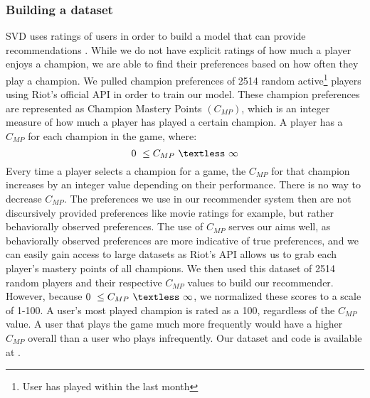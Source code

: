 \documentclass [11pt]{IEEEtran}
\begin{document}
\subsubsection{Building a dataset}
SVD uses ratings of users in order to build a model that can provide recommendations \cite{koren2009matrix}. While we do not have explicit ratings of how much a player enjoys a champion, we are able to find their preferences based on how often they play a champion. We pulled champion preferences of 2514 random active\footnote{User has played within the last month} players using Riot’s official API \cite{riotapi} in order to train our model. These champion preferences are represented as Champion Mastery Points $(C_{MP})$, which is an integer measure of how much a player has played a certain champion. A player has a $C_{MP}$ for each champion in the game, where: 
$$
0 \ \leq C_{MP} \ \textless \ \infty
$$
Every time a player selects a champion for a game, the $C_{MP}$ for that champion increases by an integer value depending on their performance. There is no way to decrease $C_{MP}$. The preferences we use in our recommender system then are not discursively provided preferences like movie ratings for example, but rather behaviorally observed preferences. The use of $C_{MP}$ serves our aims well, as behaviorally observed preferences are more indicative of true preferences, and we can easily gain access to large datasets as Riot's API \cite{riotapi} allows us to grab each player's mastery points of all champions. We then used this dataset of 2514 random players and their respective $C_{MP}$ values to build our recommender. However, because $0 \ \leq C_{MP} \ \textless \ \infty$, we normalized these scores to a scale of 1-100. A user's most played champion is rated as a 100, regardless of the $C_{MP}$ value. A user that plays the game much more frequently would have a higher $C_{MP}$ overall than a user who plays infrequently. Our dataset and code is available at \cite{github}. 
\end{document}
